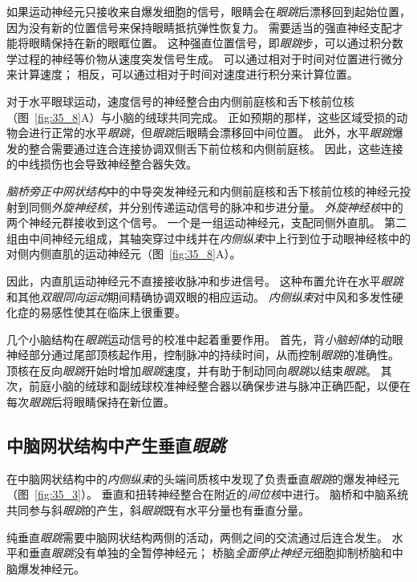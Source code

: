 如果运动神经元只接收来自爆发细胞的信号，眼睛会在\textit{眼跳}后漂移回到起始位置，因为没有新的位置信号来保持眼睛抵抗弹性恢复力。
需要适当的强直神经支配才能将眼睛保持在新的眼眶位置。
这种强直位置信号，即\textit{眼跳}步，可以通过积分数学过程的神经等价物从速度突发信号生成。
可以通过相对于时间对位置进行微分来计算速度；
相反，可以通过相对于时间对速度进行积分来计算位置。


对于水平眼球运动，速度信号的神经整合由内侧前庭核和舌下核前位核（图~\ref{fig:35_8}A）与小脑的绒球共同完成。
正如预期的那样，这些区域受损的动物会进行正常的水平\textit{眼跳}，但\textit{眼跳}后眼睛会漂移回中间位置。
此外，水平\textit{眼跳}爆发的整合需要通过连合连接协调双侧舌下前位核和内侧前庭核。
因此，这些连接的中线损伤也会导致神经整合器失效。


\textit{脑桥旁正中网状结构}中的中导突发神经元和内侧前庭核和舌下核前位核的神经元投射到同侧\textit{外旋神经核}，并分别传递运动信号的脉冲和步进分量。
\textit{外旋神经核}中的两个神经元群接收到这个信号。
一个是一组运动神经元，支配同侧外直肌。
第二组由中间神经元组成，其轴突穿过中线并在\textit{内侧纵束}中上行到位于动眼神经核中的对侧内侧直肌的运动神经元（图~\ref{fig:35_8}A）。


因此，内直肌运动神经元不直接接收脉冲和步进信号。
这种布置允许在水平\textit{眼跳}和其他\textit{双眼同向运动}期间精确协调双眼的相应运动。
\textit{内侧纵束}对中风和多发性硬化症的易感性使其在临床上很重要。


几个小脑结构在\textit{眼跳}运动信号的校准中起着重要作用。
首先，背\textit{小脑蚓体}的动眼神经部分通过尾部顶核起作用，控制脉冲的持续时间，从而控制\textit{眼跳}的准确性。
顶核在反向\textit{眼跳}开始时增加\textit{眼跳}速度，并有助于制动同向\textit{眼跳}以结束\textit{眼跳}。
其次，前庭小脑的绒球和副绒球校准神经整合器以确保步进与脉冲正确匹配，以便在每次\textit{眼跳}后将眼睛保持在新位置。



\subsection{中脑网状结构中产生垂直\textit{眼跳}}

在中脑网状结构中的\textit{内侧纵束}的头端间质核中发现了负责垂直\textit{眼跳}的爆发神经元（图~\ref{fig:35_3}）。
垂直和扭转神经整合在附近的\textit{间位核}中进行。
脑桥和中脑系统共同参与斜\textit{眼跳}的产生，斜\textit{眼跳}既有水平分量也有垂直分量。


纯垂直\textit{眼跳}需要中脑网状结构两侧的活动，两侧之间的交流通过后连合发生。
水平和垂直\textit{眼跳}没有单独的全暂停神经元；
桥脑\textit{全面停止神经元}细胞抑制桥脑和中脑爆发神经元。



